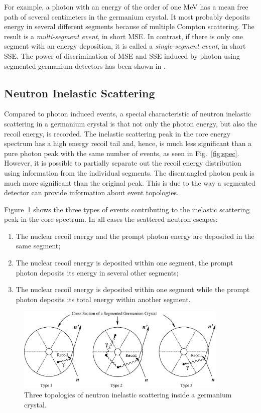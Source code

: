 \documentclass{elsart}
\begin{document}
For example, a photon with an energy of the order of one MeV has a
mean free path of several centimeters in the germanium crystal. It
most probably deposits energy in several different segments because of
multiple Compton scattering. The result is a \emph{multi-segment
  event}, in short MSE. In contrast, if there is only one segment with
an energy deposition, it is called a \emph{single-segment event}, in
short SSE. The power of discrimination of MSE and SSE induced by
photon using segmented germanium detectors has been shown in
\cite{pid}.

\subsection{Neutron Inelastic Scattering}
Compared to photon induced events, a special characteristic of neutron
inelastic scattering in a germanium crystal is that not only the
photon energy, but also the recoil energy, is recorded. The inelastic
scattering peak in the core energy spectrum has a high energy recoil
tail and, hence, is much less significant than a pure photon peak with
the same number of events, as seen in Fig.~\ref{fig:spec}. However, it
is possible to partially separate out the recoil energy distribution
using information from the individual segments. The disentangled
photon peak is much more significant than the original peak. This is
due to the way a segmented detector can provide information about
event topologies.

Figure~\ref{fig:inel} shows the three types of events contributing to
the inelastic scattering peak in the core spectrum. In all cases the
scattered neutron escapes:
\begin{enumerate}
\item The nuclear recoil energy and the prompt photon energy are
  deposited in the same segment;
\item The nuclear recoil energy is deposited within one segment, the
  prompt photon deposits its energy in several other segments;
\item The nuclear recoil energy is deposited within one segment while
  the prompt photon deposits its total energy within another segment.
\end{enumerate}

\begin{figure}[tbhp]
  \centering
  \includegraphics[width=0.9\textwidth]{ine_1.eps}
  \caption{Three topologies of neutron inelastic scattering inside a
    germanium crystal.}
  \label{fig:inel}
\end{figure}
\end{document}
